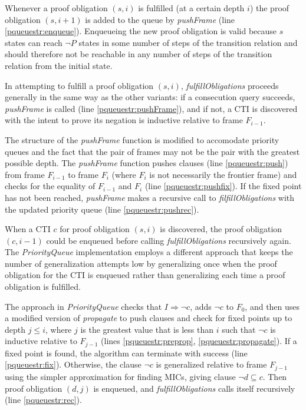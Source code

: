 \documentclass[12pt,a4paper,twoside,openright]{report}
\begin{document}
{{Whenever a proof obligation $(s,i)$ is fulfilled (at a certain depth $i$) the proof obligation
$(s, i + 1)$ is added to the queue by {\it pushFrame} (line \ref{pqueuestr:enqueue}).
Enqueueing the new proof obligation is valid
because $s$ states can reach $\neg P$ states in some
number of steps of the transition relation and should therefore
not be reachable in any number of steps of the transition relation from the initial state.

In attempting to fulfill a proof obligation $(s,i)$, {\it fulfillObligations} proceeds
generally in the same way as the other variants: if a consecution query succeeds,
{\it pushFrame} is called (line \ref{pqueuestr:pushFrame}), and if not, a CTI is discovered with the intent
to prove its negation is inductive relative to frame $F_{i - 1}$.

The structure of the {\it pushFrame} function is modified to
accomodate priority queues
and the fact that the pair of frames may not be the pair with the greatest possible depth.
The {\it pushFrame} function pushes clauses (line \ref{pqueuestr:push})
from frame $F_{i - 1}$ to frame $F_i$ (where
$F_i$ is not necessarily the frontier frame) and checks
for the equality of $F_{i - 1}$ and $F_i$ (line \ref{pqueuestr:pushfix}). If the fixed point has not been
reached, {\it pushFrame} makes a recursive call to {\it filfillObligations} with the updated
priority queue (line \ref{pqueuestr:pushrec}).

When a CTI $c$ for proof obligation $(s,i)$ is discovered, the proof obligation $(c,i - 1)$
could be enqueued before calling {\it fulfillObligations} recursively again.
The \emph{PriorityQueue} implementation employs a different approach that keeps the number of
generalization attempts low by generalizing once when the proof obligation
for the CTI is enqueued rather than generalizing each time a proof obligation
is fulfilled.

The approach in \emph{PriorityQueue} checks
that $I \Rightarrow \neg c$, adds $\neg c$ to $F_0$, and then uses a modified
version of {\it propagate} to push clauses and check for fixed points up to
depth $j \leq i$, where $j$ is the greatest value that is less than $i$
such that $\neg c$ is inductive relative to $F_{j - 1}$
(lines \ref{pqueuestr:preprop}, \ref{pqueuestr:propagate}). If a fixed point is
found, the algorithm can terminate with success (line \ref{pqueuestr:fix}). Otherwise, the clause
$\neg c$ is generalized relative to frame $F_{j - 1}$
using the simpler approximation for finding MICs, giving clause
$\neg d \subseteq c$. Then proof obligation $(d,j)$ is enqueued, and
{\it fulfillObligations} calls itself recursively (line \ref{pqueuestr:rec}).

}}
\end{document}
